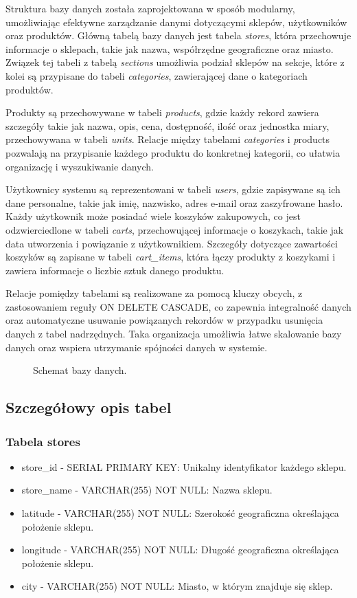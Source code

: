 Struktura bazy danych została zaprojektowana w sposób modularny, umożliwiając efektywne zarządzanie danymi dotyczącymi sklepów, użytkowników oraz produktów. Główną tabelą bazy danych jest tabela \textit{stores}, która przechowuje informacje o sklepach, takie jak nazwa, współrzędne geograficzne oraz miasto. Związek tej tabeli z tabelą \textit{sections} umożliwia podział sklepów na sekcje, które z kolei są przypisane do tabeli \textit{categories}, zawierającej dane o kategoriach produktów.

Produkty są przechowywane w tabeli \textit{products}, gdzie każdy rekord zawiera szczegóły takie jak nazwa, opis, cena, dostępność, ilość oraz jednostka miary, przechowywana w tabeli \textit{units}. Relacje między tabelami \textit{categories} i \textit{p}roducts pozwalają na przypisanie każdego produktu do konkretnej kategorii, co ułatwia organizację i wyszukiwanie danych.

Użytkownicy systemu są reprezentowani w tabeli \textit{users}, gdzie zapisywane są ich dane personalne, takie jak imię, nazwisko, adres e-mail oraz zaszyfrowane hasło. Każdy użytkownik może posiadać wiele koszyków zakupowych, co jest odzwierciedlone w tabeli \textit{carts}, przechowującej informacje o koszykach, takie jak data utworzenia i powiązanie z użytkownikiem. 
Szczegóły dotyczące zawartości koszyków są zapisane w tabeli \textit{cart\_items}, która łączy produkty z koszykami i zawiera informacje o liczbie sztuk danego produktu.

Relacje pomiędzy tabelami są realizowane za pomocą kluczy obcych, z zastosowaniem reguły ON DELETE CASCADE, co zapewnia integralność danych oraz automatyczne usuwanie powiązanych rekordów w przypadku usunięcia danych z tabel nadrzędnych. Taka organizacja umożliwia łatwe skalowanie bazy danych oraz wspiera utrzymanie spójności danych w systemie.

\begin{figure}[H]
    
    \caption{Schemat bazy danych.}
    \label{fig:database}
\end{figure}

\subsection{Szczegółowy opis tabel}

\subsubsection{Tabela stores}
\begin{itemize}
\item store\_id - SERIAL PRIMARY KEY: Unikalny identyfikator każdego sklepu.
\item store\_name - VARCHAR(255) NOT NULL: Nazwa sklepu.
\item latitude - VARCHAR(255) NOT NULL: Szerokość geograficzna określająca położenie sklepu.
\item longitude - VARCHAR(255) NOT NULL: Długość geograficzna określająca położenie sklepu.
\item city - VARCHAR(255) NOT NULL: Miasto, w którym znajduje się sklep.
\end{itemize}

